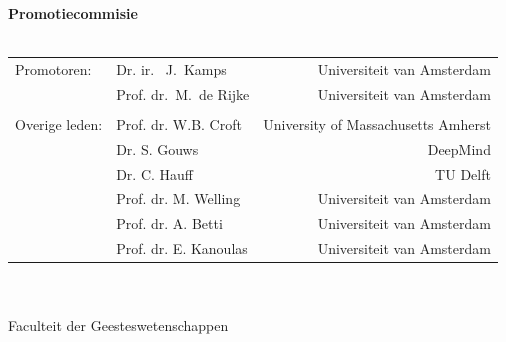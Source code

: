 {%
\clearpage
\noindent%
{\bf Promotiecommisie}\\
\\
\begin{tabular}[t]{@{}llr}
Promotoren:      
& Dr. ir. \ J.~Kamps  & Universiteit van Amsterdam \\  
& Prof. dr.\ M.~de Rijke  & Universiteit van Amsterdam \\  

\\
Overige leden: 
& Prof. dr. W.B. Croft   &  University of Massachusetts Amherst \\ 
& Dr. S. Gouws  &  DeepMind \\ 
& Dr. C. Hauff   &   TU Delft \\ 
& Prof. dr. M. Welling    &  Universiteit van Amsterdam \\ 
& Prof. dr. A. Betti    &  Universiteit van Amsterdam \\ 
& Prof. dr. E. Kanoulas    &  Universiteit van Amsterdam \\ 

\end{tabular}\\
\\
Faculteit der Geesteswetenschappen \\ %
} %
\par\vspace {5cm}

